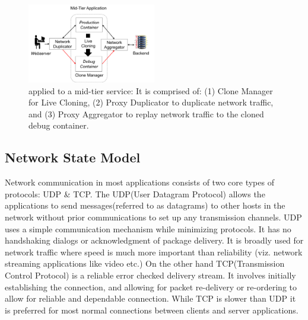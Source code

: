 \begin{figure}[h]
  \begin{center}
    \includegraphics[width=0.5\textwidth]{figs/arch.png}
    \caption{\parikshan applied to a mid-tier service: It is comprised of: (1) Clone Manager for Live Cloning, (2) Proxy Duplicator to duplicate network traffic, and (3) Proxy Aggregator to replay network traffic to the cloned debug container.}
    \label{fig:workflow}
  \end{center}
\end{figure}








\iffalse
\subsection{Network State Model}
\label{sec:networkStateModel}

Network communication in most applications consists of two core types of protocols: UDP \& TCP.
The UDP(User Datagram Protocol) allows the applications to send messages(referred to as datagrams) to other hosts in the network without prior communications to set up any transmission channels.
UDP uses a simple communication mechanism while minimizing protocols. 
It has no handshaking dialogs or acknowledgment of package delivery. It is broadly used for network traffic where speed is much more important than reliability (viz. network streaming applications like video etc.)
On the other hand TCP(Transmission Control Protocol) is a reliable error checked delivery stream.
It involves initially establishing the connection, and allowing for packet re-delivery or re-ordering to allow for reliable and dependable connection. 
While TCP is slower than UDP it is preferred for most normal connections between clients and server applications.

